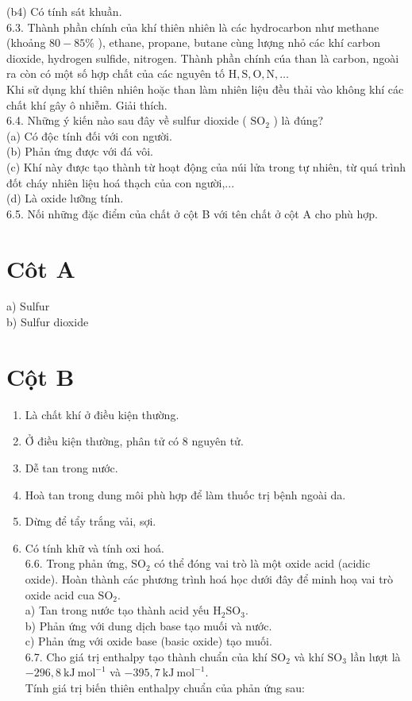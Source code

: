 \documentclass[10pt]{article}
\begin{document}
(b4) Có tính sát khuần.\\
6.3. Thành phần chính của khí thiên nhiên là các hydrocarbon như methane (khoảng $80-85 \%$ ), ethane, propane, butane cùng lượng nhỏ các khí carbon dioxide, hydrogen sulfide, nitrogen. Thành phần chính cúa than là carbon, ngoài ra còn có một số hợp chất của các nguyên tố $\mathrm{H}, \mathrm{S}, \mathrm{O}, \mathrm{N}, \ldots$\\
Khi sử dụng khí thiên nhiên hoặc than làm nhiên liệu đều thải vào không khí các chất khí gây ô nhiễm. Giải thích.\\
6.4. Những ý kiến nào sau đây về sulfur dioxide ( $\mathrm{SO}_{2}$ ) là đúng?\\
(a) Có độc tính đối với con người.\\
(b) Phản ứng được với đá vôi.\\
(c) Khí này được tạo thành từ hoạt động của núi lửa trong tự nhiên, từ quá trình đốt cháy nhiên liệu hoá thạch của con người,...\\
(d) Là oxide lưỡng tính.\\
6.5. Nối những đặc điểm của chất ở cột B với tên chất ở cột A cho phù hợp.

\section*{Côt A}
a) Sulfur\\
b) Sulfur dioxide

\section*{Cột B}
\begin{enumerate}
  \item Là chất khí ở điều kiện thường.
  \item Ở điều kiện thường, phân tử có 8 nguyên tử.
  \item Dễ tan trong nước.
  \item Hoà tan trong dung môi phù hợp để làm thuốc trị bệnh ngoài da.
  \item Dừng để tẩy trắng vải, sợi.
  \item Có tính khữ và tính oxi hoá.\\
6.6. Trong phản ứng, $\mathrm{SO}_{2}$ có thể đóng vai trò là một oxide acid (acidic oxide). Hoàn thành các phương trình hoá học dưới đây để minh hoạ vai trò oxide acid cua $\mathrm{SO}_{2}$.\\
a) Tan trong nước tạo thành acid yếu $\mathrm{H}_{2} \mathrm{SO}_{3}$.\\
b) Phản ứng với dung dịch base tạo muối và nước.\\
c) Phản ứng với oxide base (basic oxide) tạo muối.\\
6.7. Cho giá trị enthalpy tạo thành chuẩn của khí $\mathrm{SO}_{2}$ và khí $\mathrm{SO}_{3}$ lần lượt là $-296,8 \mathrm{~kJ} \mathrm{~mol}^{-1}$ và $-395,7 \mathrm{~kJ} \mathrm{~mol}^{-1}$.\\
Tính giá trị biến thiên enthalpy chuẩn của phản ứng sau:
\end{enumerate}
\end{document}
